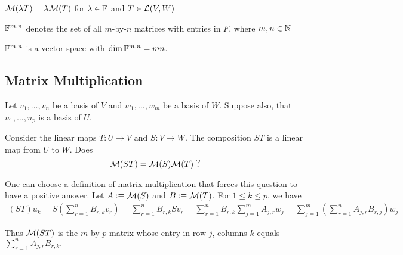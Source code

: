 \setcounter{thm}{37}
\begin{thm}
  $\mathcal{M}(\lambda T) = \lambda \mathcal{M}(T)$ for $\lambda \in \mathbb{F}$ and $T \in \mathcal{L} (V,W)$
\end{thm}

\begin{mydef} 
  $\mathbb{F}^{m,n}$ denotes the set of all $m$-by-$n$ matrices with entries in $F$, where $m,n \in \mathbb{N}$
\end{mydef}

\begin{thm} %
  $\mathbb{F}^{m,n}$ is a vector space with $\dim \mathbb{F}^{m,n}=mn$.
\end{thm}


\subsection{Matrix Multiplication}

Let $v_1, \ldots, v_n$ be a basis of $V$ and $w_1, \ldots, w_m$ be a basis of $W.$ Suppose also, that $u_1, \ldots, u_p$ is a basis of $U$.

Consider the linear maps $T: U \to V$ and $S: V \to W$. The composition $ST$ is a linear map from $U$ to $W$. Does
\begin{equation}
  \mmatrix(ST) = \mmatrix(S) \mmatrix(T) \; {\mathlarger ?}
\end{equation}

One can choose a definition of matrix multiplication that forces this question to have a positive answer. Let $A :\equiv \mathcal{M}(S)$ and $B :\equiv \mathcal{M}(T)$. For $1 \leq k \leq p$, we have
\begin{equation}
  \begin{aligned}
    (ST) u_k 
    = S \left ( \sum_{r=1}^{n} B_{r,k} v_r \right )
    =  \sum_{r=1}^{n} B_{r,k} S v_r 
    =  \sum_{r=1}^{n} B_{r,k} \sum_{j=1}^{m} A_{j,r}  w_j 
    =  \sum_{j=1}^{m} \left( \sum_{r=1}^{n} A_{j,r}  B_{r,j} \right) w_j 
  \end{aligned}
\end{equation}

Thus $\mathcal{M}(ST)$ is the $m$-by-$p$ matrix whose entry in row $j$, columns $k$ equals 
  $\sum_{r=1}^{n} A_{j,r}  B_{r,k}.$


